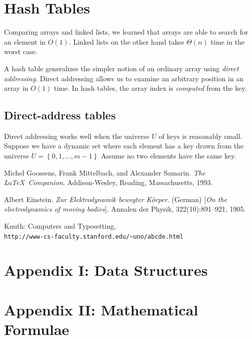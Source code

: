 \documentclass[]{book}
\renewcommand\cftchapafterpnum{\vskip 10pt}
\begin{document}
  \chapter{Hash Tables}
    Comparing arrays and linked lists, we learned that arrays are able to search for an element
    in $O(1)$. Linked lists on the other hand takes $\Theta(n)$ time in the worst case.

    A hash table generalizes the simpler notion of an ordinary array using \textit{direct addressing}. 
    Direct addressing allows us to examine an arbitrary position in an array in $O(1)$ time. In
    hash tables, the array index is \textit{computed} from the key.

    \section{Direct-address tables}
      Direct addressing works well when the universe $U$ of keys is reasonably small.
      Suppose we have a dynamic set where each element has a key drawn from the universe $U = \left\{ 0,1, \ldots, m - 1 \right\}$
      Assume no two elements have the same key.

  \backmatter
  \setlength{\cftbeforechapskip}{15pt}
  \renewcommand\cftchapafterpnum{\vskip 10pt}
  \renewcommand\bibname{\large{References}}
  \begin{thebibliography}{9}
  Michel Goossens, Frank Mittelbach, and Alexander Samarin.
  \textit{The \LaTeX\ Companion}.
  Addison-Wesley, Reading, Massachusetts, 1993.

  Albert Einstein.
  \textit{Zur Elektrodynamik bewegter K{\"o}rper}. (German)
  [\textit{On the electrodynamics of moving bodies}].
  Annalen der Physik, 322(10):891–921, 1905.

  Knuth: Computers and Typesetting,
  \\\texttt{http://www-cs-faculty.stanford.edu/\~{}uno/abcde.html}
  \end{thebibliography}


  \appendix
  \chapter{\large{Appendix I: \textnormal{Data Structures}}}
  \chapter{\large{Appendix II: \textnormal{Mathematical Formulae}}}
  \printindex
\end{document}
